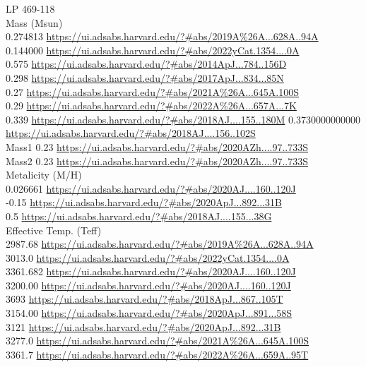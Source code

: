LP 469-118\\

Mass (Msun)\\
0.274813 \url{https://ui.adsabs.harvard.edu/?#abs/2019A%26A...628A..94A}\\
0.144000 \url{https://ui.adsabs.harvard.edu/?#abs/2022yCat.1354....0A}\\
0.575 \url{https://ui.adsabs.harvard.edu/?#abs/2014ApJ...784..156D}\\
0.298 \url{https://ui.adsabs.harvard.edu/?#abs/2017ApJ...834...85N}\\
0.27 \url{https://ui.adsabs.harvard.edu/?#abs/2021A%26A...645A.100S}\\
0.29 \url{https://ui.adsabs.harvard.edu/?#abs/2022A%26A...657A...7K}\\
0.339 \url{https://ui.adsabs.harvard.edu/?#abs/2018AJ....155..180M}
0.3730000000000 \url{https://ui.adsabs.harvard.edu/?#abs/2018AJ....156..102S}\\
Mass1 0.23 \url{https://ui.adsabs.harvard.edu/?#abs/2020AZh....97..733S}\\
Mass2 0.23 \url{https://ui.adsabs.harvard.edu/?#abs/2020AZh....97..733S}\\
Metalicity (M/H)\\
0.026661 \url{https://ui.adsabs.harvard.edu/?#abs/2020AJ....160..120J}\\
-0.15 \url{https://ui.adsabs.harvard.edu/?#abs/2020ApJ...892...31B}\\
0.5 \url{https://ui.adsabs.harvard.edu/?#abs/2018AJ....155...38G}\\
Effective Temp. (Teff)\\
2987.68 \url{https://ui.adsabs.harvard.edu/?#abs/2019A%26A...628A..94A}\\
3013.0 \url{https://ui.adsabs.harvard.edu/?#abs/2022yCat.1354....0A}\\
3361.682 \url{https://ui.adsabs.harvard.edu/?#abs/2020AJ....160..120J}\\
3200.00 \url{https://ui.adsabs.harvard.edu/?#abs/2020AJ....160..120J}\\
3693 \url{https://ui.adsabs.harvard.edu/?#abs/2018ApJ...867..105T}\\
3154.00 \url{https://ui.adsabs.harvard.edu/?#abs/2020ApJ...891...58S}\\
3121 \url{https://ui.adsabs.harvard.edu/?#abs/2020ApJ...892...31B}\\
3277.0 \url{https://ui.adsabs.harvard.edu/?#abs/2021A%26A...645A.100S}\\
3361.7 \url{https://ui.adsabs.harvard.edu/?#abs/2022A%26A...659A..95T}\\
